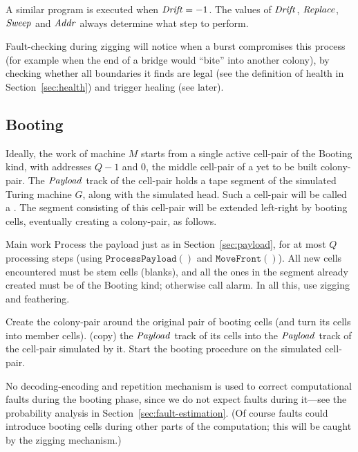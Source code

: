 \documentclass[11pt]{memoir}
\theoremstyle{definition} %
\newcommand{\fld}[1]{\ensuremath{\textit{#1\/}}}
\newcommand{\rul}[1]{\ensuremath{\texttt{#1}}}
\def\G{G} %
\newcommand{\Q}{Q} %
\newcommand{\Addr}{\fld{Addr}}
\newcommand{\Drift}{\fld{Drift}}
\newcommand{\Payload}{\fld{Payload}}
\newcommand{\Replace}{\fld{Replace}}
\newcommand{\Sweep}{\fld{Sweep}} %
\newcommand{\MoveFront}{\rul{MoveFront}}
\newcommand{\ProcessPayload}{\rul{ProcessPayload}}
\begin{document}
A similar program is executed when \( \Drift=-1 \).
The values of \( \Drift \), \( \Replace \), \( \Sweep \) and \( \Addr \) always determine what step
to perform.
  
  Fault-checking during zigging will notice
when a burst compromises this process (for example when the end of a bridge would
``bite'' into another colony), by checking whether all boundaries it finds are legal (see the definition of
health in Section~\ref{sec:health}) and trigger healing (see later).

\subsection{Booting}\label{sec:booting}

Ideally, the work of machine \( M \) starts from a single active cell-pair of the Booting kind,
with addresses \( \Q-1 \) and 0, the middle cell-pair of a yet to be built colony-pair.
The \( \Payload \) track of the cell-pair holds a tape segment of the simulated Turing machine \( \G \),
along with the simulated head.
Such a cell-pair will be called a .
The segment consisting of this cell-pair will be extended left-right by booting cells,
eventually creating a colony-pair, as follows.

\begin{description}
  \begin{sloppypar}
  \item[Main work]
    Process the payload just as in Section~\ref{sec:payload}, for at most \( \Q \) processing steps
    (using \( \ProcessPayload() \) and \( \MoveFront() \)).
    All new cells encountered must be stem cells (blanks), and all the ones in the segment already created
    must be of the Booting kind; otherwise call alarm.
    In all this, use zigging and feathering.    
  \end{sloppypar}
  
\item[Lifting]
  Create the colony-pair around the original pair of booting cells (and turn its cells into member cells).
  (copy) the \( \Payload \) track of its cells into
  the \( \Payload \) track of the cell-pair simulated by it.
  Start the booting procedure on the simulated cell-pair.
\end{description}

No decoding-encoding and repetition
mechanism is used to correct computational faults during the booting phase, since
we do not expect faults
during it---see the probability analysis in Section~\ref{sec:fault-estimation}.
(Of course faults could introduce booting cells during other
parts of the computation; this will be caught by the zigging mechanism.)
\end{document}
